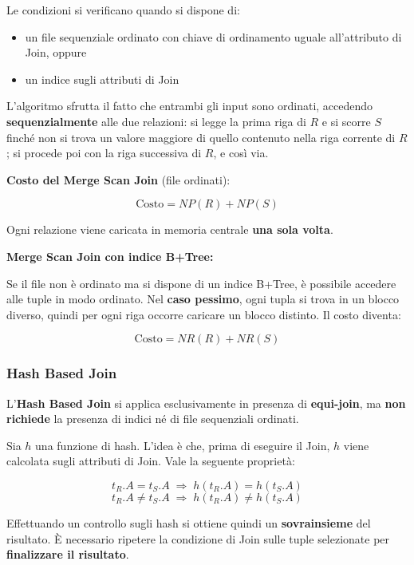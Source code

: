 \noindent Le condizioni si verificano quando si dispone di:
\begin{itemize}
	\item un file sequenziale ordinato con chiave di ordinamento uguale all'attributo di Join, oppure
	\item un indice sugli attributi di Join
\end{itemize}

\bigskip
\noindent L'algoritmo sfrutta il fatto che entrambi gli input sono ordinati, accedendo \textbf{sequenzialmente} alle due relazioni: si legge la prima riga di $R$ e si scorre $S$ finché non si trova un valore maggiore di quello contenuto nella riga corrente di $R$; si procede poi con la riga successiva di $R$, e così via.

\bigskip
\noindent\textbf{Costo del Merge Scan Join} (file ordinati):

\[
\text{Costo} = NP(R) + NP(S)
\]

\noindent Ogni relazione viene caricata in memoria centrale \textbf{una sola volta}.

\bigskip
\noindent\textbf{Merge Scan Join con indice B+Tree:}

\noindent Se il file non è ordinato ma si dispone di un indice B+Tree, è possibile accedere alle tuple in modo ordinato. Nel \textbf{caso pessimo}, ogni tupla si trova in un blocco diverso, quindi per ogni riga occorre caricare un blocco distinto. Il costo diventa:

\[
\text{Costo} = NR(R) + NR(S)
\]
\subsubsection{Hash Based Join}

L'\textbf{Hash Based Join} si applica esclusivamente in presenza di \textbf{equi-join}, ma \textbf{non richiede} la presenza di indici né di file sequenziali ordinati.

\bigskip
\noindent Sia $h$ una funzione di hash. L'idea è che, prima di eseguire il Join, $h$ viene calcolata sugli attributi di Join. Vale la seguente proprietà:

\[
t_R.A = t_S.A \;\Rightarrow\; h(t_R.A) = h(t_S.A)
\]
\[
t_R.A \neq t_S.A \;\Rightarrow\; h(t_R.A) \neq h(t_S.A)
\]

\noindent Effettuando un controllo sugli hash si ottiene quindi un \textbf{sovrainsieme} del risultato. È necessario ripetere la condizione di Join sulle tuple selezionate per \textbf{finalizzare il risultato}.

